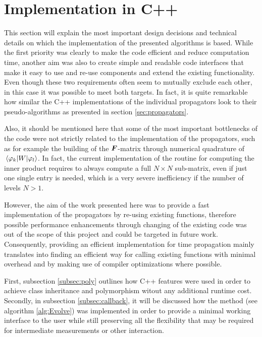 \section{Implementation in C++}
\label{sec:implementation}
%
This section will explain the most important design decisions and technical details on which the implementation of the presented algorithms is based.
While the first priority was clearly to make the code efficient and reduce computation time, another aim was also to create simple and readable code interfaces that make it easy to use and re-use components and extend the existing functionality. \\
%
Even though these two requirements often seem to mutually exclude each other, in this case it was possible to meet both targets.
In fact, it is quite remarkable how similar the C++ implementations of the individual propagators look to their pseudo-algorithms as presented in section \ref{sec:propagators}.
\par\medskip
%
Also, it should be mentioned here that some of the most important bottlenecks of the code were not strictly related to the implementation of the propagators, such as for example the building of the $\bm{F}$-matrix through numerical quadrature of $\matrixel{\varphi_k}{W}{\varphi_l}$.
In fact, the current implementation of the  routine for computing the inner product requires to always compute a full $N \times N$ sub-matrix, even if just one single entry is needed, which is a very severe inefficiency if the number of levels $N>1$.
\par\medskip
%
However, the aim of the work presented here was to provide a fast implementation of the propagators by re-using existing functions, therefore possible performance enhancements through changing of the existing code was out of the scope of this project and could be targeted in future work.
Consequently, providing an efficient implementation for time propagation mainly translates into finding an efficient way for calling existing functions with minimal overhead and by making use of compiler optimizations where possible.
\par\medskip
%
First, subsection \ref{subsec:poly} outlines how C++ features were used in order to achieve class inheritance and polymorphism witout any additional runtime cost.
Secondly, in subsection \ref{subsec:callback}, it will be discussed how the  method (see algorithm \ref{alg:Evolve}) was implemented in order to provide a minimal working interface to the user while still preserving all the flexibility that may be required for intermediate measurements or other interaction.
